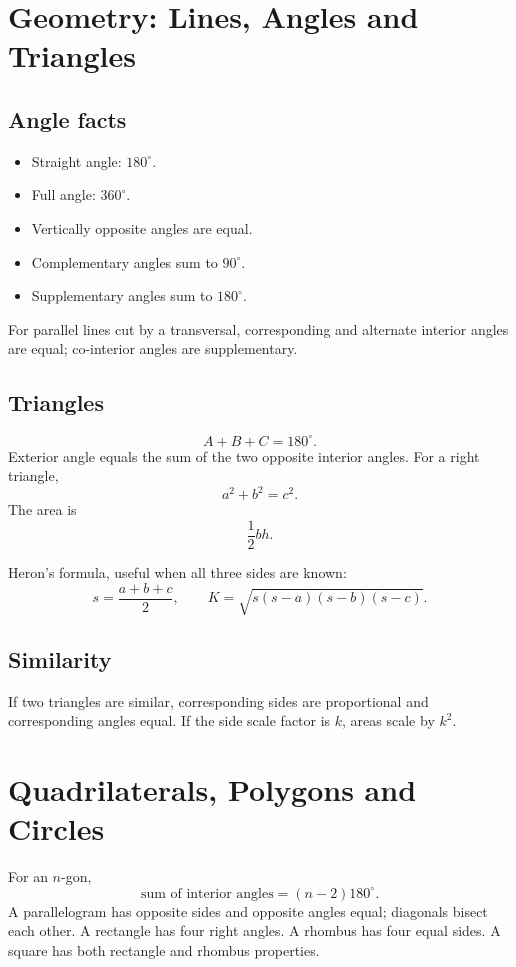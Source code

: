 \documentclass[12pt,a4paper,oneside]{book}
\begin{document}
\chapter[Lines, Angles and Triangles]{Geometry: Lines, Angles and Triangles}
\section{Angle facts}
\begin{itemize}
\item Straight angle: \(180^\circ\).
\item Full angle: \(360^\circ\).
\item Vertically opposite angles are equal.
\item Complementary angles sum to \(90^\circ\).
\item Supplementary angles sum to \(180^\circ\).
\end{itemize}

For parallel lines cut by a transversal, corresponding and alternate interior angles are equal; co-interior angles are supplementary.

\section{Triangles}
\[A+B+C=180^\circ.\]
Exterior angle equals the sum of the two opposite interior angles.
For a right triangle,
\[a^2+b^2=c^2.\]
The area is
\[\frac12 bh.\]

Heron's formula, useful when all three sides are known:
\[s=\frac{a+b+c}{2},\qquad K=\sqrt{s(s-a)(s-b)(s-c)}.\]

\section{Similarity}
If two triangles are similar, corresponding sides are proportional and corresponding angles equal. If the side scale factor is \(k\), areas scale by \(k^2\).

\chapter[Quadrilaterals, Polygons and Circles]{Quadrilaterals, Polygons and Circles}
For an \(n\)-gon,
\[\text{sum of interior angles}=(n-2)180^\circ.\]
A parallelogram has opposite sides and opposite angles equal; diagonals bisect each other. A rectangle has four right angles. A rhombus has four equal sides. A square has both rectangle and rhombus properties.
\end{document}
